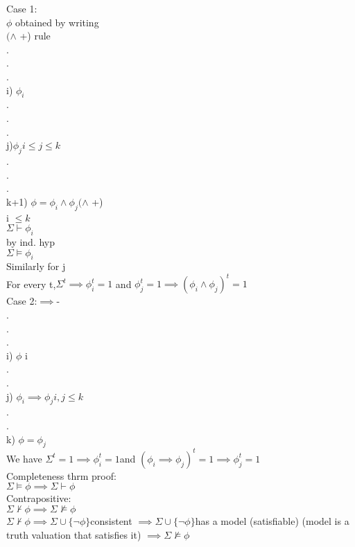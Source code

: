 \documentclass[12pt,oneside,notitlepage]{book}
\theoremstyle{definition}
\begin{document}
Case 1: \\
$\phi$ obtained by writing \\
$(\land$ +) rule \\
. \\
. \\
. \\
i) $\phi_i$ \\
. \\
. \\
. \\
j)$ \phi_j  i \leq j \leq k$ \\
. \\
. \\
. \\
k+1) $\phi = \phi_i \land \phi_j (\land$ +) \\
i $\leq k$ \\
$\Sigma \vdash \phi_i$ \\
by ind. hyp \\
$\Sigma \vDash \phi_i$ \\
Similarly for j \\
For every t,$ \Sigma^t \implies \phi_i^t =1$ and $\phi_j^t = 1 \implies (\phi_i \land \phi_j)^t = 1$ \\

Case 2:$ \implies$- \\
. \\
. \\
. \\
i) $\phi$ i \\
. \\
. \\
j) $\phi_i \implies \phi_j i,j \leq k$ \\
. \\
. \\
k) $\phi = \phi_j$ \\

We have $\Sigma^t = 1 \implies \phi_i^t = 1 $and $(\phi_i \implies \phi_j)^t = 1 \implies \phi_j^t = 1$ \\
 
Completeness thrm proof: \\
$\Sigma \vDash \phi \implies \Sigma \vdash \phi$ \\
Contrapositive: \\
$\Sigma \not \vdash \phi \implies \Sigma \not \vDash \phi$ \\
 
$\Sigma \not \vdash \phi \implies \Sigma \cup \{ \neg \phi \} $consistent $\implies \Sigma \cup \{ \neg \phi \} $has a model (satisfiable) (model is a truth valuation that  satisfies it) $\implies \Sigma \not \vDash \phi$ \\
\end{document}
